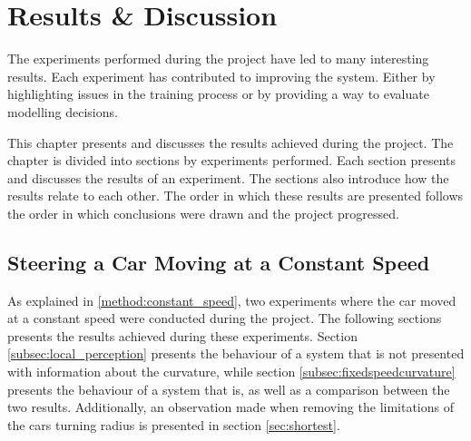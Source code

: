 

\chapter{Results \& Discussion}
The experiments performed during the project have led to many interesting results. Each experiment has contributed to improving the system. Either by highlighting issues in the training process or by providing a way to evaluate modelling decisions. 

This chapter presents and discusses the results achieved during the project. The chapter is divided into sections by experiments performed. Each section presents and discusses the results of an experiment. The sections also introduce how the results relate to each other. The order in which these results are presented follows the order in which conclusions were drawn and the project progressed.

\section{Steering a Car Moving at a Constant Speed}

As explained in \ref{method:constant_speed}, two experiments where the car moved at a constant speed were conducted during the project. The following sections presents the results achieved during these experiments. Section \ref{subsec:local_perception} presents the behaviour of a system that is not presented with information about the curvature, while section \ref{subsec:fixedspeedcurvature} presents the behaviour of a system that is, as well as a comparison between the two results. Additionally, an observation made when removing the limitations of the cars turning radius is presented in section \ref{sec:shortest}. 

